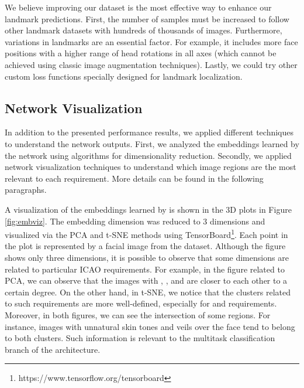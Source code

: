 We believe improving our dataset is the most effective way to enhance our landmark predictions. First, the number of samples must be increased to follow other landmark datasets with hundreds of thousands of images. Furthermore, variations in landmarks are an essential factor. For example, it includes more face positions with a higher range of head rotations in all axes (which cannot be achieved using classic image augmentation techniques). Lastly, we could try other custom loss functions specially designed for landmark localization.
 

 
\subsection{Network Visualization} \label{sec:netviz}
 
In addition to the presented performance results, we applied different techniques to understand the network outputs. First, we analyzed the embeddings learned by the network using algorithms for dimensionality reduction. Secondly, we applied network visualization techniques to understand which image regions are the most relevant to each requirement. More details can be found in the following paragraphs.
 
A visualization of the embeddings learned by \methodname is shown in the 3D plots in Figure \ref{fig:embviz}. The embedding dimension was reduced to 3 dimensions and visualized via the PCA and t-SNE methods using TensorBoard\footnote{https://www.tensorflow.org/tensorboard}. Each point in the plot is represented by a facial image from the dataset. Although the figure shows only three dimensions, it is possible to observe that some dimensions are related to particular ICAO requirements. For example, in the figure related to PCA, we can observe that the images with \variedbackground, \unnaturalskintone, and \veiloverface are closer to each other to a certain degree. On the other hand, in t-SNE, we notice that the clusters related to such requirements are more well-defined, especially for \variedbackground and \veiloverface requirements. Moreover, in both figures, we can see the intersection of some regions. For instance, images with unnatural skin tones and veils over the face tend to belong to both clusters. Such information is relevant to the multitask classification branch of the \methodname architecture. 
 
